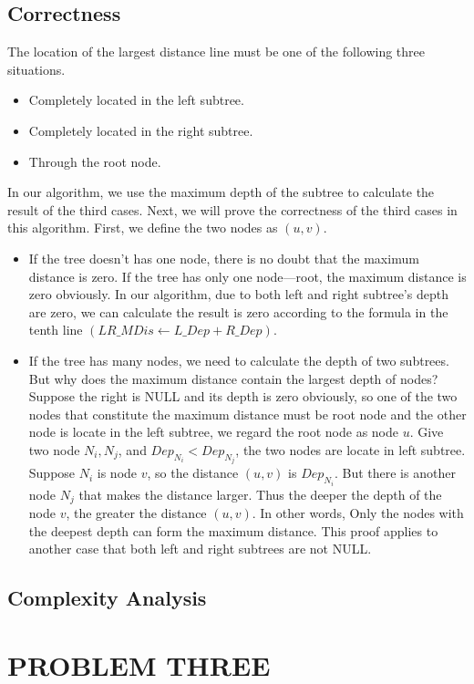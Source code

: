 \documentclass[UTF8,a4paper]{article}
\begin{document}
	\subsection{Correctness}
	The location of the largest distance line must be one of the following three situations.
	\begin{itemize}
		\item Completely located in the left subtree.
		\item Completely located in the right subtree.
		\item Through the root node.	
	\end{itemize}
	In our algorithm, we use the maximum depth of the subtree to calculate the result of the third cases. Next, we will prove the correctness of the third cases in this algorithm. First, we define the two nodes as $ (u,v) $.
	\begin{itemize}
		\item If the tree doesn't has one node, there is no doubt that the maximum distance is zero.
		If the tree has only one node---root, the maximum distance is zero obviously. In our algorithm, due to both left and right subtree's depth are zero, we can calculate the result is zero according to the formula in the tenth line $( LR\_MDis \gets L\_Dep + R\_Dep )$.
		\item If the tree has many nodes, we need to calculate the depth of two subtrees. But why does the maximum distance contain the largest depth of nodes? Suppose the right is NULL and its depth is zero obviously, so one of the two nodes that constitute the maximum distance must be root node and the other node is locate in the left subtree, we regard the root node as node $ u $. Give two node $ N_{i},N_{j} $, and $ Dep_{N_{i}} < Dep_{N_{j}} $, the two nodes are locate in left subtree. Suppose $ N_{i} $ is node $ v $, so the distance $ (u,v) $ is $ Dep_{N_{i}} $. But there is another node $ N_{j} $ that makes the distance larger. Thus the deeper the depth of the node $ v $, the greater the distance $ (u,v) $. In other words, Only the nodes with the deepest depth can form the maximum distance. This proof applies to another case that both left and right subtrees are not NULL. 
	\end{itemize}
	
	\subsection{Complexity Analysis}
	
	
	\newpage
	\section{PROBLEM THREE}
\end{document}
